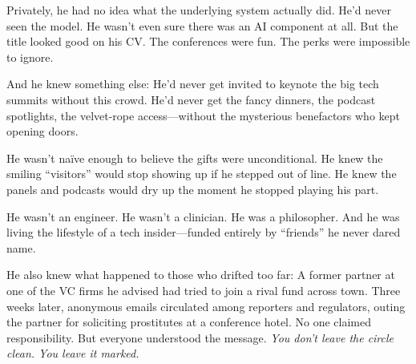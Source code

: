 Privately, he had no idea what the underlying system actually did. He’d never seen the model. He wasn’t even sure there was an AI component at all. But the title looked good on his CV. The conferences were fun. The perks were impossible to ignore.

And he knew something else:  
He’d never get invited to keynote the big tech summits without this crowd.  
He’d never get the fancy dinners, the podcast spotlights, the velvet-rope access—without the mysterious benefactors who kept opening doors.

He wasn’t naïve enough to believe the gifts were unconditional.  
He knew the smiling ``visitors'' would stop showing up if he stepped out of line.  
He knew the panels and podcasts would dry up the moment he stopped playing his part.

He wasn’t an engineer. He wasn’t a clinician. He was a philosopher.  
And he was living the lifestyle of a tech insider—funded entirely by ``friends'' he never dared name.

He also knew what happened to those who drifted too far:  
A former partner at one of the VC firms he advised had tried to join a rival fund across town.  
Three weeks later, anonymous emails circulated among reporters and regulators, outing the partner for soliciting prostitutes at a conference hotel.  
No one claimed responsibility. But everyone understood the message.  
\textit{You don’t leave the circle clean. You leave it marked.}

\medskip

